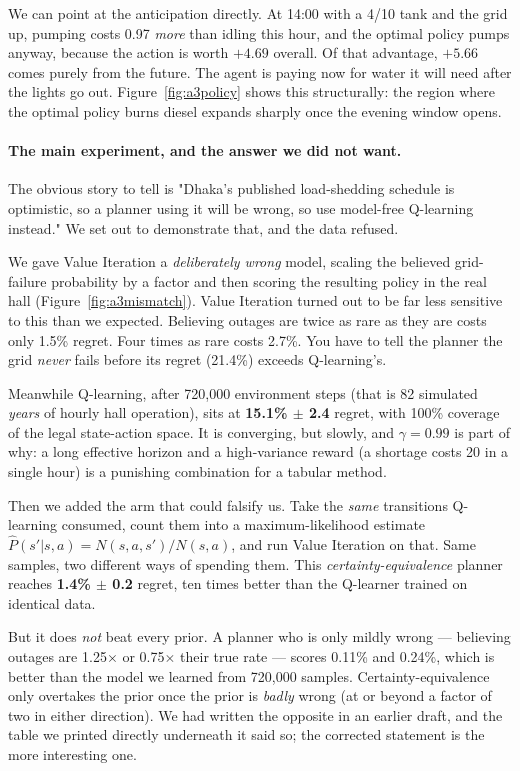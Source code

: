 \documentclass{ai-lab-report}
\begin{document}
We can point at the anticipation directly. At 14:00 with a 4/10 tank and the grid up, pumping
costs 0.97 \emph{more} than idling this hour, and the optimal policy pumps anyway, because the
action is worth $+4.69$ overall. Of that advantage, $+5.66$ comes purely from the future. The
agent is paying now for water it will need after the lights go out. Figure~\ref{fig:a3policy}
shows this structurally: the region where the optimal policy burns diesel expands sharply once
the evening window opens.

\paragraph{The main experiment, and the answer we did not want.}
The obvious story to tell is "Dhaka's published load-shedding schedule is optimistic, so a
planner using it will be wrong, so use model-free Q-learning instead." We set out to
demonstrate that, and the data refused.

We gave Value Iteration a \emph{deliberately wrong} model, scaling the believed grid-failure
probability by a factor and then scoring the resulting policy in the real hall
(Figure~\ref{fig:a3mismatch}). Value Iteration turned out to be far less sensitive to this than we expected. Believing outages are
twice as rare as they are costs only 1.5\% regret. Four times as rare costs 2.7\%. You have to
tell the planner the grid \emph{never} fails before its regret (21.4\%) exceeds Q-learning's.

Meanwhile Q-learning, after 720{,}000 environment steps (that is 82 simulated \emph{years} of
hourly hall operation), sits at \textbf{15.1\% $\pm$ 2.4} regret, with 100\% coverage of the
legal state-action space. It is converging, but slowly, and $\gamma = 0.99$ is part of why: a
long effective horizon and a high-variance reward (a shortage costs 20 in a single hour) is a
punishing combination for a tabular method.

Then we added the arm that could falsify us. Take the \emph{same} transitions Q-learning
consumed, count them into a maximum-likelihood estimate $\hat{P}(s'|s,a) = N(s,a,s')/N(s,a)$,
and run Value Iteration on that. Same samples, two different ways of spending them. This
\emph{certainty-equivalence} planner reaches \textbf{1.4\% $\pm$ 0.2} regret, ten times better
than the Q-learner trained on identical data.

But it does \emph{not} beat every prior. A planner who is only mildly wrong --- believing
outages are 1.25$\times$ or 0.75$\times$ their true rate --- scores 0.11\% and 0.24\%, which is
better than the model we learned from 720{,}000 samples. Certainty-equivalence only overtakes
the prior once the prior is \emph{badly} wrong (at or beyond a factor of two in either
direction). We had written the opposite in an earlier draft, and the table we printed directly
underneath it said so; the corrected statement is the more interesting one.
\end{document}
